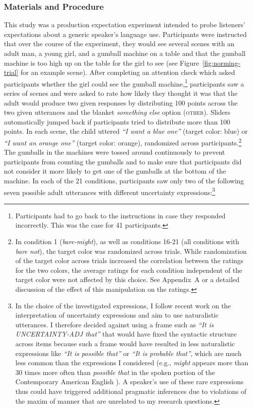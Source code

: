 \subsubsection{Materials and Procedure}
This study was a production expectation experiment intended to probe listeners' expectations about a generic speaker's language use.
Participants were instructed that over the course of the experiment, they would see several scenes with an adult man, 
a young girl, and a gumball machine on a table and 
that the gumball machine is too high up on the table for the girl to see (see Figure~\ref{fig:norming-trial} for an example scene). 
After completing an attention check which asked participants whether 
the girl could see the gumball machine,\footnote{Participants had to go back to the instructions in case they responded incorrectly. This was the case for 41 participants.} 
participants saw a series of scenes  and were asked to rate how likely they thought it was that the 
adult would produce two given responses by distributing 100 points across the two given utterances and the 
blanket \textit{something else} option (\textsc{other}). Sliders automatically jumped back if participants tried to distribute more than 100 points. 
In each scene, the child uttered \textit{``I want a blue one''} (target color: blue) or  \textit{``I want an orange one''} (target color: orange), randomized across participants.\footnote{In condition 1 (\textit{bare-might}), as well as conditions 16-21 (all conditions with \textit{bare not}), the target color was randomized across trials. While randomization of the target color across trials increased the correlation between the ratings for the two colors,  the average ratings for each condition independent of the target color were not affected by this choice. See Appendix~A or a detailed discussion of the effect of this manipulation on the ratings.} The gumballs in the machines were tossed around continuously to prevent participants from counting the gumballs
and to make sure that participants did not consider it more likely to get one of the gumballs at the bottom of the machine.
 In each of the 21 conditions, participants saw only  two of the following seven possible adult utterances with different uncertainty expressions:\footnote{In the choice of the investigated expressions, I follow recent work on the interpretation of uncertainty expressions \cite{Pogue2018} and aim to use naturalistic utterances. I therefore decided against using a frame such as \emph{``It is UNCERTAINTY-ADJ that''} that would have fixed the syntactic structure across items because such a frame would have resulted in less naturalistic expressions like  \emph{``It is possible that''} or  \emph{``It is probable that''}, which are much less common than the expressions I considered (e.g., \textit{might} appears more than 30 times more often than \textit{possible that} in the spoken portion of the Contemporary American English \cite{Davies2009}). A speaker's use of these rare expressions thus could have triggered additional pragmatic inferences due to violations of the maxim of manner \cite{Grice1975} that are unrelated to my research questions.}

